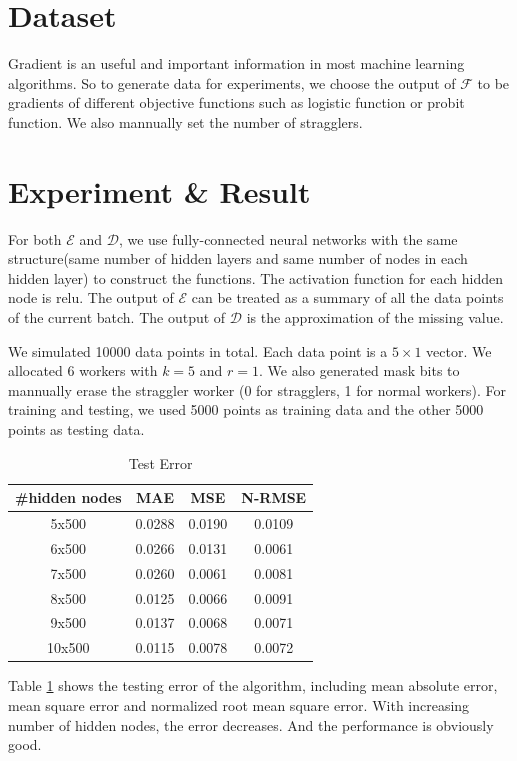 \documentclass{article}
\begin{document}
        \section{Dataset}
        Gradient is an useful and important information in most machine learning algorithms. So to generate data for experiments, we choose the output of $\mathcal{F}$ to be gradients of different objective functions such as logistic function or probit function. We also mannually set the number of stragglers.
        
        \section{Experiment \& Result}
        For both $\mathcal{E}$ and $\mathcal{D}$, we use fully-connected neural networks with the same structure(same number of hidden layers and same number of nodes in each hidden layer) to construct the functions. The activation function for each hidden node is relu.
The output of $\mathcal{E}$ can be treated as a summary of all the data points of the current batch. The output of $\mathcal{D}$ is the approximation of the missing value.

        We simulated 10000 data points in total. Each data point is a $5 \times 1$ vector. We allocated 6 workers with $k = 5$ and $r = 1$. We also generated mask bits to mannually erase the straggler worker (0 for stragglers, 1 for normal workers). For training and testing, we used 5000 points as training data and the other 5000 points as testing data.
        \begin{table}[H]
        \centering
\begin{tabular}{@{}cccc@{}}
\toprule
\#hidden nodes & MAE         & MSE          & N-RMSE       \\ \midrule
5x500          & 0.0288 & 0.0190  & 0.0109   \\
6x500          & 0.0266 & 0.0131  & 0.0061  \\
7x500          & 0.0260 & 0.0061 & 0.0081  \\
8x500          & 0.0125  & 0.0066  & 0.0091  \\
9x500          & 0.0137 & 0.0068  & 0.0071 \\
10x500         & 0.0115 & 0.0078  & 0.0072 \\ \bottomrule
\end{tabular}
\caption{Test Error}
\label{tab:test-error}
\end{table}

Table \ref{tab:test-error} shows the testing error of the algorithm, including mean absolute error, mean square error and normalized root mean square error. With increasing number of hidden nodes, the error decreases. And the performance is obviously good.
\end{document}

